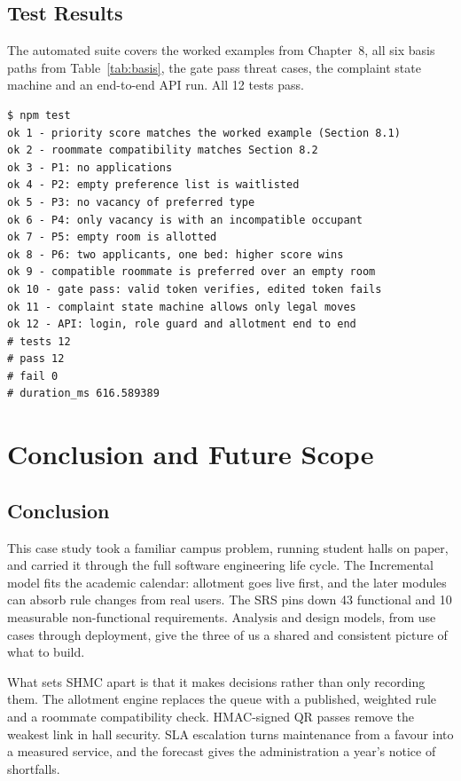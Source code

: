 \documentclass[11pt,a4paper]{report}
\begin{document}


\section{Test Results}
The automated suite covers the worked examples from Chapter~8, all six basis paths from Table~\ref{tab:basis}, the gate pass threat cases, the complaint state machine and an end-to-end API run. All 12 tests pass.
\begin{lstlisting}
$ npm test
ok 1 - priority score matches the worked example (Section 8.1)
ok 2 - roommate compatibility matches Section 8.2
ok 3 - P1: no applications
ok 4 - P2: empty preference list is waitlisted
ok 5 - P3: no vacancy of preferred type
ok 6 - P4: only vacancy is with an incompatible occupant
ok 7 - P5: empty room is allotted
ok 8 - P6: two applicants, one bed: higher score wins
ok 9 - compatible roommate is preferred over an empty room
ok 10 - gate pass: valid token verifies, edited token fails
ok 11 - complaint state machine allows only legal moves
ok 12 - API: login, role guard and allotment end to end
# tests 12
# pass 12
# fail 0
# duration_ms 616.589389
\end{lstlisting}

\chapter{Conclusion and Future Scope}

\section{Conclusion}
This case study took a familiar campus problem, running student halls on paper, and carried it through the full software engineering life cycle. The Incremental model fits the academic calendar: allotment goes live first, and the later modules can absorb rule changes from real users. The SRS pins down 43 functional and 10 measurable non-functional requirements. Analysis and design models, from use cases through deployment, give the three of us a shared and consistent picture of what to build.

What sets SHMC apart is that it makes decisions rather than only recording them. The allotment engine replaces the queue with a published, weighted rule and a roommate compatibility check. HMAC-signed QR passes remove the weakest link in hall security. SLA escalation turns maintenance from a favour into a measured service, and the forecast gives the administration a year's notice of shortfalls.
\end{document}
